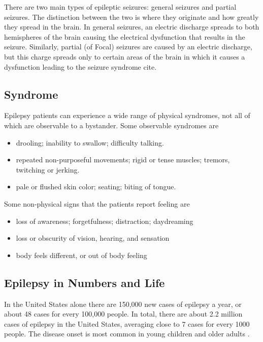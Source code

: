 There are two main types of epileptic seizures: general seizures and partial seizures. The distinction between the two is where they originate and how greatly they spread in the brain. In general seizures, an electric discharge spreads to both hemispheres of the brain causing the electrical dysfunction that results in the seizure. Similarly, partial (of Focal) seizures are caused by an electric discharge, but this charge spreads only to certain areas of the brain in which it causes a dysfunction leading to the seizure syndrome cite{}. 

\subsection{Syndrome}
Epilepsy patients can experience a wide range of physical syndromes, not all of which are observable to a bystander. Some observable syndromes are 
\begin{itemize}
	\item drooling; inability to swallow; difficulty talking.
	\item repeated non-purposeful movements; rigid or tense muscles; tremors, twitching or jerking.
	\item pale or flushed skin color; seating; biting of tongue.
\end{itemize}

Some non-physical signs that the patients report feeling are
\begin{itemize}
	\item loss of awareness; forgetfulness; distraction; daydreaming
	\item loss or obscurity of vision, hearing, and sensation
	\item body feels different, or out of body feeling
\end{itemize}

\subsection{Epilepsy in Numbers and Life}
In the United States alone there are 150,000 new cases of epilepsy a year, or about 48 cases for every 100,000 people. In total, there are about 2.2 million cases of epilepsy in the United States, averaging close to 7 cases for every 1000 people. The disease onset is most common in young children and older adults \cite{Epilepsy.com.stats}. 

